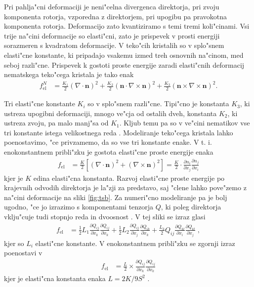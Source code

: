 \documentclass[12pt,twoside,openright,final,a4paper]{report}
\renewcommand{\vec}{\mathbf}
\newcommand{\qodv}[2]{\ensuremath{\frac{\partial Q_{#1}}{\partial x_{#2}}}}
\newcommand{\nodv}[2]{\ensuremath{\frac{\partial n_{#1}}{\partial x_{#2}}}}
\begin{document}
Pri pahlja"cni deformaciji je neni"celna divergenca direktorja, pri zvoju komponenta rotorja, vzporedna z direktorjem, pri upogibu pa pravokotna komponenta rotorja. 
Deformacijo zato kvantiziramo s temi tremi koli"cinami. 
Vsi trije na"cini deformacije so elasti"cni, zato je prispevek v prosti energiji sorazmeren s kvadratom deformacije. 
V teko"cih kristalih so v splo"snem elasti"cne konstante, ki pripadajo vsakemu izmed treh osnovnih na"cinom, med seboj razli"cne. 
Prispevek k gostoti proste energije zaradi elasti"cnih deformacij nematskega teko"cega kristala je tako enak
\begin{align}
 f_{\mathrm{el}}^N &= \frac{K_1}{2} (\nabla \cdot \vec n)^2 + \frac{K_2}{2} (\vec n \cdot \nabla \times \vec n)^2 + \frac{K_3}{2} (\vec n \times \nabla \times \vec n)^2. 
\end{align}

Tri elasti"cne konstante $K_i$ so v splo"snem razli"cne. Tipi"cno je konstanta $K_3$, ki ustreza upogibni deformaciji, mnogo ve"cja od ostalih dveh, konstanta $K_2$, ki ustreza zvoju, pa malo manj"sa od $K_1$. 
Kljub temu pa so v ve"cini nematikov vse tri konstante istega velikostnega reda \cite{degennes}. 
Modeliranje teko"cega kristala lahko poenostavimo, "ce privzamemo, da so vse tri konstante enake. 
V t. i. enokonstantnem pribli"zku je gostota elasti"cne proste energije enaka
\begin{align}
 f_{\mathrm{el}} &= \frac{K}{2} \left[(\nabla \cdot \vec n)^2 + (\nabla \times \vec n)^2\right] = \frac{K}{2} \cdot \nodv{i}{j}\nodv{j}{i}
\end{align}
kjer je $K$ edina elasti"cna konstanta.
Razvoj elasti"cne proste energije po krajevnih odvodih direktorja je la"zji za predstavo, saj "clene lahko pove"zemo z na"cini deformacije na sliki \ref{fig:tsb}. 
Za numeri"cno modeliranje pa je bolj ugodno, "ce jo izrazimo s komponentami tenzorja $Q$, ki poleg direktorja vklju"cuje tudi stopnjo reda in dvoosnost \cite{copar-phd}. 
V tej sliki se izraz glasi
\begin{align}
 f_{\mathrm{el}} &= \frac{1}{2}L_1\qodv{ij}{k}\qodv{ij}{k} + \frac{1}{2}L_2 \qodv{ij}{j}\qodv{ik}{k} + \frac{L_3}{2}Q_{ij}\qodv{kl}{i}\qodv{kl}{j}\;,
\end{align}
kjer so $L_i$ elasti"cne konstante. V enokonstantnem pribli"zku se zgornji izraz poenostavi v 
\begin{align}
f_{\mathrm{el}} &= \frac{L}{2} \times \qodv{ij}{k}\qodv{ij}{k} 
\end{align}
kjer je elasti"cna konstanta enaka $L = 2K/9S^2$ \cite{ravnik-zumer-ldg}. 
\end{document}
